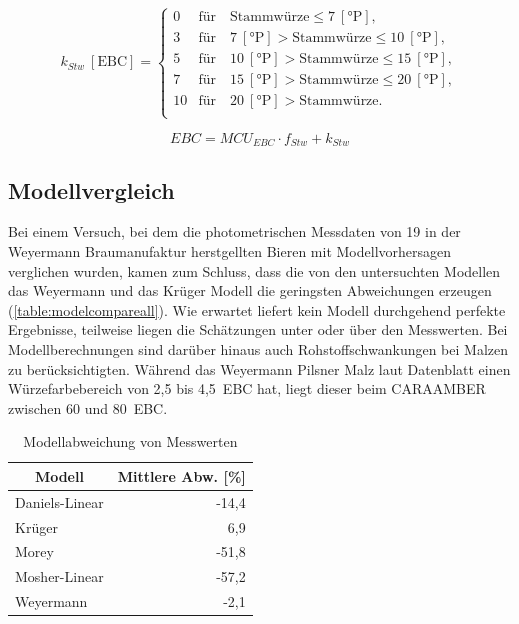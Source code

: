 \documentclass[a4paper,parskip=half]{scrartcl}
\newcommand{\MCUEBC}{\mathit{MCU}_{EBC}}
\newcommand{\EBC}{\mathit{EBC}}
\newcommand{\uebc}{\:[\textrm{EBC}]}
\newcommand{\uplato}{\:[\textrm{°P}]}
\newcommand{\fstw}{f_{Stw}}
\newcommand{\kstw}{k_{Stw}}
\begin{document}
\begin{equation}
\kstw \uebc = \begin{cases}
0  & \text{für} \quad \text{Stammwürze} \le 7 \uplato, \\
3  & \text{für} \quad 7 \uplato > \text{Stammwürze} \le 10 \uplato, \\
5  & \text{für} \quad 10 \uplato > \text{Stammwürze} \le 15 \uplato, \\
7  & \text{für} \quad 15 \uplato > \text{Stammwürze} \le 20 \uplato, \\
10 & \text{für} \quad 20 \uplato > \text{Stammwürze}. \\
\end{cases}
\label{eq:weyermannkstw}
\end{equation}

\begin{equation}
\EBC = \MCUEBC \cdot \fstw + \kstw
\label{eq:ebcweyermann}
\end{equation}

\subsection*{Modellvergleich}

Bei einem Versuch, bei dem die photometrischen Messdaten von 19 in der Weyermann Braumanufaktur herstgellten Bieren mit Modellvorhersagen verglichen wurden, kamen \textcite{KrausWeyermann2021b} zum Schluss, dass die von den untersuchten Modellen das Weyermann und das Krüger Modell die geringsten Abweichungen erzeugen (\autoref{table:modelcompareall}). Wie erwartet liefert kein Modell durchgehend perfekte Ergebnisse, teilweise liegen die Schätzungen unter oder über den Messwerten. Bei Modellberechnungen sind darüber hinaus auch Rohstoffschwankungen bei Malzen zu berücksichtigten. Während das Weyermann Pilsner Malz laut Datenblatt einen Würzefarbebereich von 2,5 bis 4,5~EBC hat, liegt dieser beim CARAAMBER zwischen 60 und 80~EBC.

\begin{table}[H]
\centering
\begin{tabular}{lr}
\toprule
\multicolumn{1}{c}{\textbf{Modell}} & \multicolumn{1}{c}{\textbf{Mittlere Abw. [\%]}} \\
\midrule
Daniels-Linear & -14,4 \\
Krüger & 6,9 \\
Morey & -51,8 \\
Mosher-Linear & -57,2 \\
Weyermann & -2,1 \\
\bottomrule
\end{tabular}
\caption{Modellabweichung von Messwerten \parencite{KrausWeyermann2021b}}
\label{table:modelcompareall}
\end{table}
\end{document}
